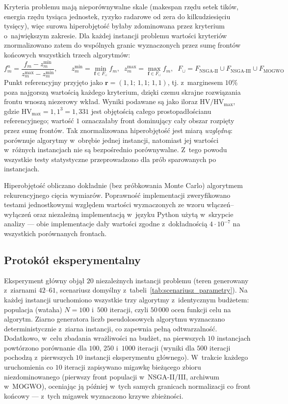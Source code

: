 Kryteria problemu mają nieporównywalne skale (makespan rzędu setek tików, energia
rzędu tysiąca jednostek, ryzyko radarowe od zera do kilkudziesięciu tysięcy), więc
surowa hiperobjętość byłaby zdominowana przez kryterium o~największym zakresie.
Dla każdej instancji problemu wartości kryteriów znormalizowano zatem do wspólnych
granic wyznaczonych przez sumę frontów końcowych wszystkich trzech algorytmów:
\begin{equation}
    \label{eq:hv_norm}
    f_m^{n} = \frac{f_m - z_m^{\min}}{z_m^{\max} - z_m^{\min}},
    \qquad
    z_m^{\min} = \min_{\mathbf{f} \in F_{\cup}} f_m,\;\;
    z_m^{\max} = \max_{\mathbf{f} \in F_{\cup}} f_m,\;\;
    F_{\cup} = F_{\text{NSGA-II}} \cup F_{\text{NSGA-III}} \cup F_{\text{MOGWO}}
\end{equation}
Punkt referencyjny przyjęto jako $\mathbf{r} = (1{,}1;\, 1{,}1;\, 1{,}1)$, tj.
z~marginesem $10\%$ poza najgorszą wartością każdego kryterium, dzięki czemu
skrajne rozwiązania frontu wnoszą niezerowy wkład. Wyniki podawane są jako iloraz
$\mathrm{HV}/\mathrm{HV}_{\max}$, gdzie $\mathrm{HV}_{\max} = 1{,}1^3 = 1{,}331$
jest objętością całego prostopadłościanu referencyjnego; wartość $1$ oznaczałaby
front dominujący cały obszar rozpięty przez sumę frontów. Tak znormalizowana
hiperobjętość jest miarą \emph{względną}: porównuje algorytmy w~obrębie jednej
instancji, natomiast jej wartości w~różnych instancjach nie są bezpośrednio
porównywalne. Z~tego powodu wszystkie testy statystyczne przeprowadzono dla prób
sparowanych po instancjach.

Hiperobjętość obliczano dokładnie (bez próbkowania Monte Carlo) algorytmem
rekurencyjnego cięcia wymiarów. Poprawność implementacji zweryfikowano testami
jednostkowymi względem wartości wyznaczonych ze wzoru włączeń--wyłączeń oraz
niezależną implementacją w~języku Python użytą w~skrypcie analizy --- obie
implementacje dały wartości zgodne z~dokładnością $4 \cdot 10^{-7}$ na wszystkich
porównanych frontach.

\subsection{Protokół eksperymentalny}
\label{sec:analiza_protokol}
Eksperyment główny objął $20$ niezależnych instancji problemu (teren generowany
z~ziarnami $42$--$61$, scenariusz domyślny z~tabeli~\ref{tab:scenariusz_parametry}).
Na każdej instancji uruchomiono wszystkie trzy algorytmy z~identycznym budżetem:
populacja (wataha) $N = 100$ i~$500$ iteracji, czyli $50\,000$ ocen funkcji celu na
algorytm. Ziarno generatora liczb pseudolosowych algorytmu wyznaczano
deterministycznie z~ziarna instancji, co zapewnia pełną odtwarzalność. Dodatkowo,
w~celu zbadania wrażliwości na budżet, na pierwszych $10$ instancjach powtórzono
porównanie dla $100$, $250$ i~$1000$ iteracji (wyniki dla $500$ iteracji pochodzą
z~pierwszych $10$ instancji eksperymentu głównego). W~trakcie każdego uruchomienia
co $10$ iteracji zapisywano migawkę bieżącego zbioru niezdominowanego (pierwszy
front populacji w~NSGA-II/III, archiwum w~MOGWO), oceniając ją później w~tych samych
granicach normalizacji co front końcowy --- z~tych migawek wyznaczono krzywe
zbieżności.

